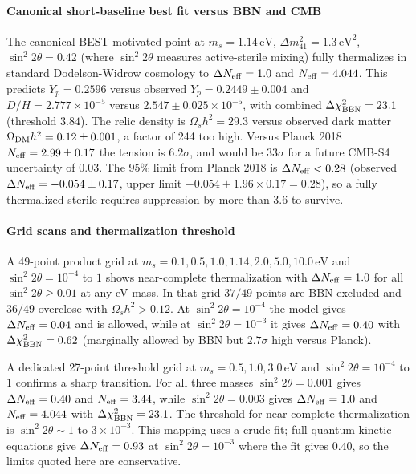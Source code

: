 \documentclass[11pt,a4paper]{article}
\begin{document}
\paragraph{Canonical short-baseline best fit versus BBN and CMB}
The canonical BEST-motivated point at $m_s = 1.14\,\mathrm{eV}$, $\Delta m^2_{41} = 1.3\,\mathrm{eV}^2$, $\sin^2 2\theta = 0.42$ (where $\sin^2 2\theta$ measures active-sterile mixing) fully thermalizes in standard Dodelson-Widrow cosmology to $\Delta N_{\rm eff} = 1.0$ and $N_{\rm eff} = 4.044$. This predicts $Y_p = 0.2596$ versus observed $Y_p = 0.2449 \pm 0.004$ and $D/H = 2.777 \times 10^{-5}$ versus $2.547 \pm 0.025 \times 10^{-5}$, with combined $\Delta\chi^2_{\rm BBN} = 23.1$ (threshold $3.84$). The relic density is $\Omega_s h^2 = 29.3$ versus observed dark matter $\Omega_{\rm DM} h^2 = 0.12 \pm 0.001$, a factor of 244 too high. Versus Planck 2018 $N_{\rm eff} = 2.99 \pm 0.17$ the tension is $6.2\sigma$, and would be $33\sigma$ for a future CMB-S4 uncertainty of $0.03$. The $95\%$ limit from Planck 2018 is $\Delta N_{\rm eff} < 0.28$ (observed $\Delta N_{\rm eff} = -0.054 \pm 0.17$, upper limit $-0.054 + 1.96 \times 0.17 = 0.28$), so a fully thermalized sterile requires suppression by more than $3.6$ to survive.

\paragraph{Grid scans and thermalization threshold}
A 49-point product grid at $m_s = 0.1, 0.5, 1.0, 1.14, 2.0, 5.0, 10.0\,\mathrm{eV}$ and $\sin^2 2\theta = 10^{-4}$ to $1$ shows near-complete thermalization with $\Delta N_{\rm eff} = 1.0$ for all $\sin^2 2\theta \ge 0.01$ at any eV mass. In that grid $37/49$ points are BBN-excluded and $36/49$ overclose with $\Omega_s h^2 > 0.12$. At $\sin^2 2\theta = 10^{-4}$ the model gives $\Delta N_{\rm eff} = 0.04$ and is allowed, while at $\sin^2 2\theta = 10^{-3}$ it gives $\Delta N_{\rm eff} = 0.40$ with $\Delta\chi^2_{\rm BBN} = 0.62$ (marginally allowed by BBN but $2.7\sigma$ high versus Planck).

A dedicated 27-point threshold grid at $m_s = 0.5, 1.0, 3.0\,\mathrm{eV}$ and $\sin^2 2\theta = 10^{-4}$ to $1$ confirms a sharp transition. For all three masses $\sin^2 2\theta = 0.001$ gives $\Delta N_{\rm eff} = 0.40$ and $N_{\rm eff} = 3.44$, while $\sin^2 2\theta = 0.003$ gives $\Delta N_{\rm eff} = 1.0$ and $N_{\rm eff} = 4.044$ with $\Delta\chi^2_{\rm BBN} = 23.1$. The threshold for near-complete thermalization is $\sin^2 2\theta \sim 1$ to $3 \times 10^{-3}$. This mapping uses a crude fit; full quantum kinetic equations give $\Delta N_{\rm eff} = 0.93$ at $\sin^2 2\theta = 10^{-3}$ where the fit gives $0.40$, so the limits quoted here are conservative.
\end{document}
